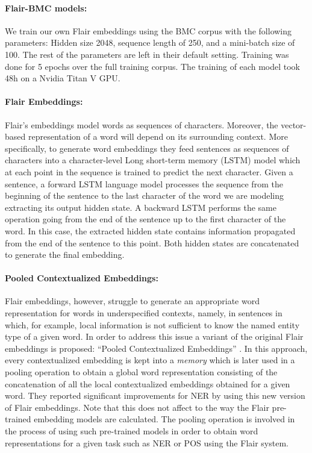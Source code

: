 \documentclass[10pt, a4paper]{article}
\begin{document}
\paragraph{Flair-BMC models:} We train our own Flair embeddings using the BMC corpus with the following parameters: Hidden size 2048, sequence length of 250, and a mini-batch size of 100. The rest of the parameters are left in their default setting. Training was done for 5 epochs over the full training corpus. The training of each model took 48h on a Nvidia Titan V GPU.

\paragraph{Flair Embeddings:} Flair's embeddings model words as sequences of characters. Moreover, the vector-based representation of a word will depend on its surrounding context. More specifically, to generate word embeddings they feed sentences as sequences of characters into a character-level Long short-term memory (LSTM) model which at each point in the sequence is trained to predict the next character. Given a sentence, a forward LSTM language model processes the sequence from the beginning of the sentence to the last character of the word we are modeling extracting its output hidden state. A backward LSTM performs the same operation going from the end of the sentence up to the first character of the word. In this case, the extracted hidden state contains information propagated from the end of the sentence to this point. Both hidden states are concatenated to generate the final embedding.

\paragraph{Pooled Contextualized Embeddings:} Flair embeddings, however, struggle to generate an appropriate word representation for words in underspecified contexts, namely, in sentences in which, for example, local information is not sufficient to know the named entity type of a given word. In order to address this issue a variant of the original Flair embeddings is proposed: ``Pooled Contextualized Embeddings'' \cite{akbik2019naacl}. In this approach, every contextualized embedding is kept into a \emph{memory} which is later used in a pooling operation to obtain a global word representation consisting of the concatenation of all the local contextualized embeddings obtained for a given word. They reported significant improvements for NER by using this new version of Flair embeddings. Note that this does not affect to the way the Flair pre-trained embedding models are calculated. The pooling operation is involved in the process of using such pre-trained models in order to obtain word representations for a given task such as NER or POS using the Flair system.
\end{document}
